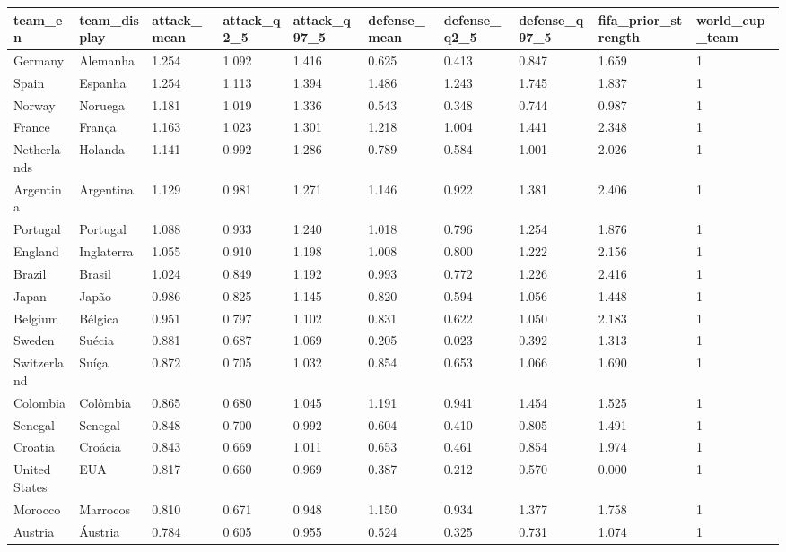 \begin{tabular}{llllllllll}
\toprule
team\_en & team\_display & attack\_mean & attack\_q2\_5 & attack\_q97\_5 & defense\_mean & defense\_q2\_5 & defense\_q97\_5 & fifa\_prior\_strength & world\_cup\_team \\
\midrule
Germany & Alemanha & 1.254 & 1.092 & 1.416 & 0.625 & 0.413 & 0.847 & 1.659 & 1 \\
Spain & Espanha & 1.254 & 1.113 & 1.394 & 1.486 & 1.243 & 1.745 & 1.837 & 1 \\
Norway & Noruega & 1.181 & 1.019 & 1.336 & 0.543 & 0.348 & 0.744 & 0.987 & 1 \\
France & França & 1.163 & 1.023 & 1.301 & 1.218 & 1.004 & 1.441 & 2.348 & 1 \\
Netherlands & Holanda & 1.141 & 0.992 & 1.286 & 0.789 & 0.584 & 1.001 & 2.026 & 1 \\
Argentina & Argentina & 1.129 & 0.981 & 1.271 & 1.146 & 0.922 & 1.381 & 2.406 & 1 \\
Portugal & Portugal & 1.088 & 0.933 & 1.240 & 1.018 & 0.796 & 1.254 & 1.876 & 1 \\
England & Inglaterra & 1.055 & 0.910 & 1.198 & 1.008 & 0.800 & 1.222 & 2.156 & 1 \\
Brazil & Brasil & 1.024 & 0.849 & 1.192 & 0.993 & 0.772 & 1.226 & 2.416 & 1 \\
Japan & Japão & 0.986 & 0.825 & 1.145 & 0.820 & 0.594 & 1.056 & 1.448 & 1 \\
Belgium & Bélgica & 0.951 & 0.797 & 1.102 & 0.831 & 0.622 & 1.050 & 2.183 & 1 \\
Sweden & Suécia & 0.881 & 0.687 & 1.069 & 0.205 & 0.023 & 0.392 & 1.313 & 1 \\
Switzerland & Suíça & 0.872 & 0.705 & 1.032 & 0.854 & 0.653 & 1.066 & 1.690 & 1 \\
Colombia & Colômbia & 0.865 & 0.680 & 1.045 & 1.191 & 0.941 & 1.454 & 1.525 & 1 \\
Senegal & Senegal & 0.848 & 0.700 & 0.992 & 0.604 & 0.410 & 0.805 & 1.491 & 1 \\
Croatia & Croácia & 0.843 & 0.669 & 1.011 & 0.653 & 0.461 & 0.854 & 1.974 & 1 \\
United States & EUA & 0.817 & 0.660 & 0.969 & 0.387 & 0.212 & 0.570 & 0.000 & 1 \\
Morocco & Marrocos & 0.810 & 0.671 & 0.948 & 1.150 & 0.934 & 1.377 & 1.758 & 1 \\
Austria & Áustria & 0.784 & 0.605 & 0.955 & 0.524 & 0.325 & 0.731 & 1.074 & 1 \\

\end{tabular}

